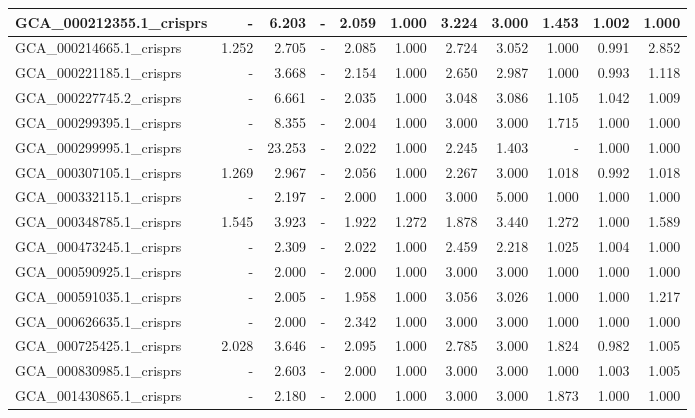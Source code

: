 \documentclass[12pt,a4paper]{article}
\begin{document}
\begin{table}[ht]
\begin{center}
\begin{tabular}{|l*{10}{|r}|}
GCA\_000212355.1\_crisprs & - & 6.203 & - & 2.059 & 1.000 & 3.224 & 3.000 & 1.453 & 1.002 & 1.000 \\ \hline
GCA\_000214665.1\_crisprs & 1.252 & 2.705 & - & 2.085 & 1.000 & 2.724 & 3.052 & 1.000 & 0.991 & 2.852 \\ \hline
GCA\_000221185.1\_crisprs & - & 3.668 & - & 2.154 & 1.000 & 2.650 & 2.987 & 1.000 & 0.993 & 1.118 \\ \hline
GCA\_000227745.2\_crisprs & - & 6.661 & - & 2.035 & 1.000 & 3.048 & 3.086 & 1.105 & 1.042 & 1.009 \\ \hline
GCA\_000299395.1\_crisprs & - & 8.355 & - & 2.004 & 1.000 & 3.000 & 3.000 & 1.715 & 1.000 & 1.000 \\ \hline
GCA\_000299995.1\_crisprs & - & 23.253 & - & 2.022 & 1.000 & 2.245 & 1.403 & - & 1.000 & 1.000 \\ \hline
GCA\_000307105.1\_crisprs & 1.269 & 2.967 & - & 2.056 & 1.000 & 2.267 & 3.000 & 1.018 & 0.992 & 1.018 \\ \hline
GCA\_000332115.1\_crisprs & - & 2.197 & - & 2.000 & 1.000 & 3.000 & 5.000 & 1.000 & 1.000 & 1.000 \\ \hline
GCA\_000348785.1\_crisprs & 1.545 & 3.923 & - & 1.922 & 1.272 & 1.878 & 3.440 & 1.272 & 1.000 & 1.589 \\ \hline
GCA\_000473245.1\_crisprs & - & 2.309 & - & 2.022 & 1.000 & 2.459 & 2.218 & 1.025 & 1.004 & 1.000 \\ \hline
GCA\_000590925.1\_crisprs & - & 2.000 & - & 2.000 & 1.000 & 3.000 & 3.000 & 1.000 & 1.000 & 1.000 \\ \hline
GCA\_000591035.1\_crisprs & - & 2.005 & - & 1.958 & 1.000 & 3.056 & 3.026 & 1.000 & 1.000 & 1.217 \\ \hline
GCA\_000626635.1\_crisprs & - & 2.000 & - & 2.342 & 1.000 & 3.000 & 3.000 & 1.000 & 1.000 & 1.000 \\ \hline
GCA\_000725425.1\_crisprs & 2.028 & 3.646 & - & 2.095 & 1.000 & 2.785 & 3.000 & 1.824 & 0.982 & 1.005 \\ \hline
GCA\_000830985.1\_crisprs & - & 2.603 & - & 2.000 & 1.000 & 3.000 & 3.000 & 1.000 & 1.003 & 1.005 \\ \hline
GCA\_001430865.1\_crisprs & - & 2.180 & - & 2.000 & 1.000 & 3.000 & 3.000 & 1.873 & 1.000 & 1.000 \\ \hline
\end{tabular}
\end{center}
\end{table}
\end{document}
